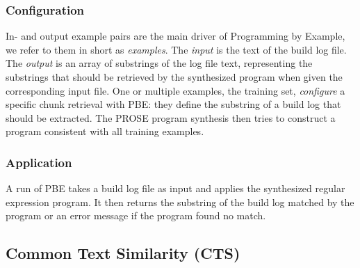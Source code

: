 \subsubsection{Configuration}
In- and output example pairs are the main driver of Programming by
Example, we refer to them in short as \emph{examples}.
The
\emph{input} is the text of the build log file.
The \emph{output} is
an array of substrings of the log file text, representing the
substrings that should be retrieved by the synthesized program when
given the corresponding input file.
One or multiple examples, the
training set, \emph{configure} a specific chunk retrieval with PBE:
they define the substring of a build log that should be extracted.
The
PROSE program synthesis then tries to construct a program consistent
with all training examples.



\subsubsection{Application}
A run of PBE takes a build log file as input and applies the
synthesized regular expression program.
It then returns the substring
of the build log matched by the program or an error message if the
program found no match.


\subsection{Common Text Similarity (CTS)}
\label{sec:expl-ts}

